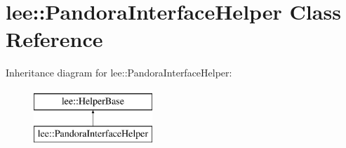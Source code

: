 \hypertarget{classlee_1_1PandoraInterfaceHelper}{\section{lee\-:\-:Pandora\-Interface\-Helper Class Reference}
\label{classlee_1_1PandoraInterfaceHelper}
}
Inheritance diagram for lee\-:\-:Pandora\-Interface\-Helper\-:\begin{figure}[H]
\begin{center}
\leavevmode
\includegraphics[height=2.000000cm]{classlee_1_1PandoraInterfaceHelper}
\end{center}
\end{figure}

